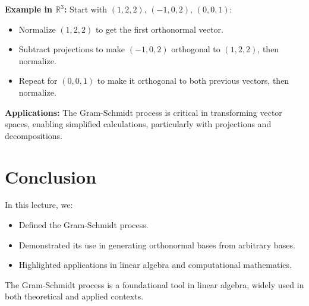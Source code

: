 \documentclass{article}
\begin{document}
\textbf{Example in $\mathbb{R}^3$:}
Start with $(1, 2, 2)$, $(-1, 0, 2)$, $(0, 0, 1)$:
\begin{itemize}
  \item Normalize $(1, 2, 2)$ to get the first orthonormal vector.
  \item Subtract projections to make $(-1, 0, 2)$ orthogonal to $(1, 2, 2)$, then normalize.
  \item Repeat for $(0, 0, 1)$ to make it orthogonal to both previous vectors, then normalize.
\end{itemize}

\textbf{Applications:}
The Gram-Schmidt process is critical in transforming vector spaces, enabling simplified calculations, particularly with projections and decompositions.

\section*{Conclusion}

In this lecture, we:
\begin{itemize}
  \item Defined the Gram-Schmidt process.
  \item Demonstrated its use in generating orthonormal bases from arbitrary bases.
  \item Highlighted applications in linear algebra and computational mathematics.
\end{itemize}

The Gram-Schmidt process is a foundational tool in linear algebra, widely used in both theoretical and applied contexts.
\end{document}
